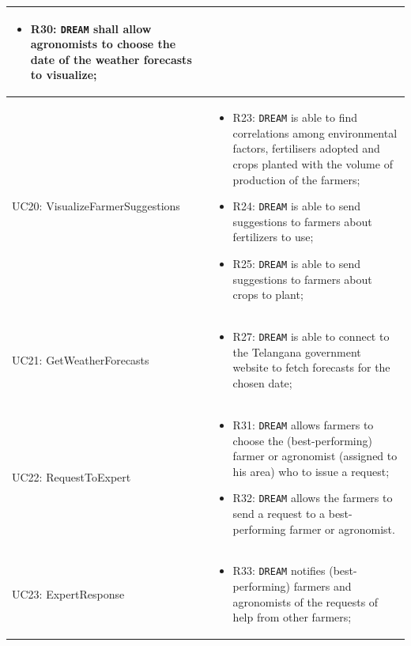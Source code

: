 \documentclass{article}
\begin{document}
\begin{longtable}[c]{|m{}|m{8cm}|}
\begin{itemize}
    \item R30: \verb|DREAM| shall allow agronomists to choose the date of the weather forecasts to visualize; 
\end{itemize} \\ 
\hline
UC20: VisualizeFarmerSuggestions & 
\begin{itemize}
    \item R23: \verb|DREAM| is able to find correlations among environmental factors, fertilisers adopted and crops planted with the volume of production of the farmers;
 
    \item R24: \verb|DREAM| is able to send suggestions to farmers about fertilizers to use;
    
    \item R25: \verb|DREAM| is able to send suggestions to farmers about crops to plant; 
\end{itemize} \\ 
\hline
UC21: GetWeatherForecasts & 
\begin{itemize}
    \item R27: \verb|DREAM| is able to connect to the Telangana government website to fetch forecasts for the chosen date;
\end{itemize} \\ \hline
\hline
UC22: RequestToExpert & 
\begin{itemize}
    \item R31: \verb|DREAM| allows farmers to choose the (best-performing) farmer or agronomist (assigned to his area) who to issue a request;
  
    \item R32: \verb|DREAM| allows the farmers to send a request to a best-performing farmer or agronomist.
    


    
\end{itemize} \\ \hline
\hline
UC23: ExpertResponse & 
\begin{itemize}
        \item R33: \verb|DREAM| notifies (best-performing) farmers and agronomists of the requests of help from other farmers;


\end{itemize}
\end{longtable}
\end{document}
